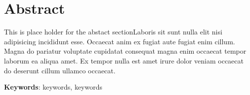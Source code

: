 

\chapter*{Abstract}

\pagestyle{plain} %
\setcounter{page}{8}
This is place holder for the abstact sectionLaboris sit sunt nulla elit nisi adipisicing incididunt esse. Occaecat anim ex fugiat aute fugiat enim cillum. Magna do pariatur voluptate cupidatat consequat magna enim occaecat tempor laborum ea aliqua amet. Ex tempor nulla est amet irure dolor veniam occaecat do deserunt cillum ullamco occaecat.



\textbf{Keywords}: keywords, keywords
\pagebreak{}
